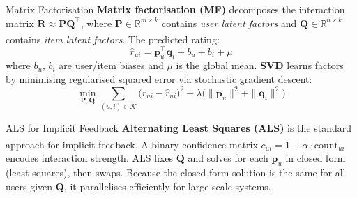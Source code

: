 \begin{v3topic}{Matrix Factorisation}
    \textbf{Matrix factorisation (MF)} decomposes the interaction matrix $\mathbf{R} \approx \mathbf{P}\mathbf{Q}^\top$, where $\mathbf{P} \in \mathbb{R}^{m \times k}$ contains \emph{user latent factors} and $\mathbf{Q} \in \mathbb{R}^{n \times k}$ contains \emph{item latent factors}\textsuperscript{\cite[][pp.~30--37]{korenMatrixFactorizationTechniques2009}}.
    The predicted rating:
    \begin{equation}
        \hat{r}_{ui} = \mathbf{p}_u^\top \mathbf{q}_i + b_u + b_i + \mu
    \end{equation}
    where $b_u$, $b_i$ are user/item biases and $\mu$ is the global mean.
    \textbf{SVD} learns factors by minimising regularised squared error via stochastic gradient descent:
    \begin{equation}
        \min_{\mathbf{P},\mathbf{Q}} \sum_{(u,i)\in\mathcal{K}} \bigl(r_{ui} - \hat{r}_{ui}\bigr)^2 + \lambda\bigl(\|\mathbf{p}_u\|^2 + \|\mathbf{q}_i\|^2\bigr)
    \end{equation}

\end{v3topic}
\begin{v3topic}{ALS for Implicit Feedback}
    \textbf{Alternating Least Squares (ALS)} is the standard approach for implicit feedback\textsuperscript{\cite[][pp.~40--45]{korenMatrixFactorizationTechniques2009}}.
    A binary confidence matrix $c_{ui} = 1 + \alpha \cdot \text{count}_{ui}$ encodes interaction strength.
    ALS fixes $\mathbf{Q}$ and solves for each $\mathbf{p}_u$ in closed form (least-squares), then swaps.
    Because the closed-form solution is the same for all users given $\mathbf{Q}$, it parallelises efficiently for large-scale systems.

\end{v3topic}
